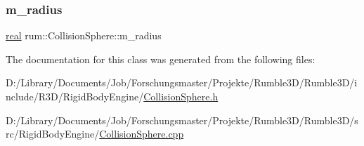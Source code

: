 \subsubsection{\texorpdfstring{m\+\_\+radius}{m\_radius}}
{\footnotesize\ttfamily \mbox{\hyperlink{namespacerum_a7e8cca23573d5eaead0f138cbaa4862c}{real}} rum\+::\+Collision\+Sphere\+::m\+\_\+radius\hspace{0.3cm}{\ttfamily [protected]}}



The documentation for this class was generated from the following files\+:\begin{DoxyCompactItemize}
\item 
D\+:/\+Library/\+Documents/\+Job/\+Forschungsmaster/\+Projekte/\+Rumble3\+D/\+Rumble3\+D/include/\+R3\+D/\+Rigid\+Body\+Engine/\mbox{\hyperlink{_collision_sphere_8h}{Collision\+Sphere.\+h}}\item 
D\+:/\+Library/\+Documents/\+Job/\+Forschungsmaster/\+Projekte/\+Rumble3\+D/\+Rumble3\+D/src/\+Rigid\+Body\+Engine/\mbox{\hyperlink{_collision_sphere_8cpp}{Collision\+Sphere.\+cpp}}\end{DoxyCompactItemize}
